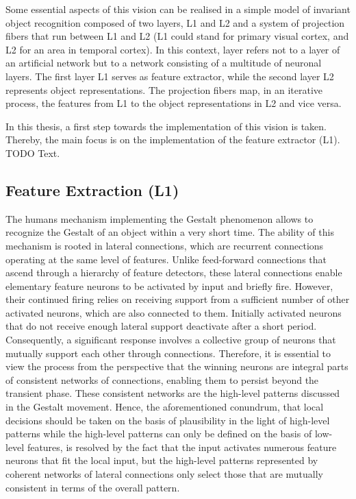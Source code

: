Some essential aspects of this vision can be realised in a simple model of invariant object recognition composed of two layers, L1 and L2 and a system of projection fibers that run between L1 and L2 (L1 could stand for primary visual cortex, and L2 for an area in temporal cortex).
In this context, layer refers not to a layer of an artificial network but to a network consisting of a multitude of neuronal layers.
The first layer L1 serves as feature extractor, while the second layer L2 represents object representations. The projection fibers map, in an iterative process, the features from L1 to the object representations in L2 and vice versa.

In this thesis, a first step towards the implementation of this vision is taken. Thereby, the main focus is on the implementation of the feature extractor (L1).
TODO Text.

\subsection{Feature Extraction (L1)}
The humans mechanism implementing the Gestalt phenomenon allows to recognize the Gestalt of an object within a very short time. The ability of this mechanism is rooted in lateral connections, which are recurrent connections operating at the same level of features. Unlike feed-forward connections that ascend through a hierarchy of feature detectors, these lateral connections enable elementary feature neurons to be activated by input and briefly fire. However, their continued firing relies on receiving support from a sufficient number of other activated neurons, which are also connected to them. Initially activated neurons that do not receive enough lateral support deactivate after a short period. Consequently, a significant response involves a collective group of neurons that mutually support each other through connections. Therefore, it is essential to view the process from the perspective that the winning neurons are integral parts of consistent networks of connections, enabling them to persist beyond the transient phase. These consistent networks are the high-level patterns discussed in the Gestalt movement. Hence, the aforementioned  conundrum, that local decisions should be taken on the basis of plausibility in the light of high-level patterns while the high-level patterns can only be defined on the basis of low-level features, is resolved by the fact that the input activates numerous feature neurons that fit the local input, but the high-level patterns represented by coherent networks of lateral connections only select those that are mutually consistent in terms of the overall pattern.

